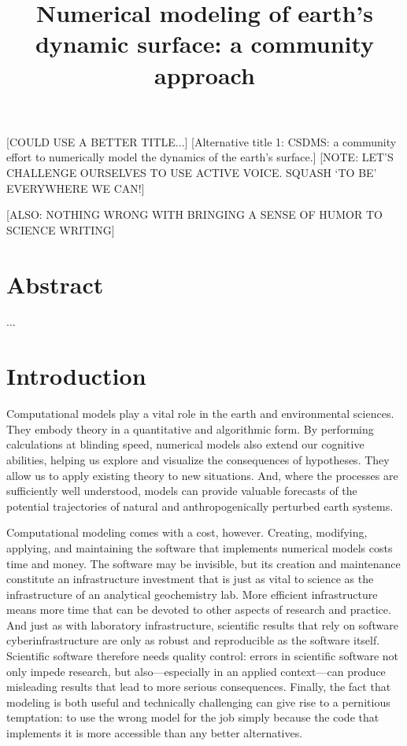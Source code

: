 \documentclass[12pt]{amsart}
\title{Numerical modeling of earth's dynamic surface: a community approach}
\author{}
\date{} %
\begin{document}
\maketitle

[COULD USE A BETTER TITLE...]
[Alternative title 1: CSDMS: a community effort to numerically model the dynamics of the earth’s surface.]
[NOTE: LET'S CHALLENGE OURSELVES TO USE ACTIVE VOICE. SQUASH `TO BE' EVERYWHERE WE CAN!]

[ALSO: NOTHING WRONG WITH BRINGING A SENSE OF HUMOR TO SCIENCE WRITING]

\section*{Abstract}

...


\section{Introduction}

Computational models play a vital role in the earth and environmental sciences. They embody theory in a quantitative and algorithmic form. By performing calculations at blinding speed, numerical models also extend our cognitive abilities, helping us explore and visualize the consequences of hypotheses. They allow us to apply existing theory to new situations. And, where the processes are sufficiently well understood, models can provide valuable forecasts of the potential trajectories of natural and anthropogenically perturbed earth systems.

Computational modeling comes with a cost, however. Creating, modifying, applying, and maintaining the software that implements numerical models costs time and money. The software may be invisible, but its creation and maintenance constitute an infrastructure investment that is just as vital to science as the infrastructure of an analytical geochemistry lab. More efficient infrastructure means more time that can be devoted to other aspects of research and practice. And just as with laboratory infrastructure, scientific results that rely on software cyberinfrastructure are only as robust and reproducible as the software itself. Scientific software therefore needs quality control: errors in scientific software not only impede research, but also---especially in an applied context---can produce misleading results that lead to more serious consequences. Finally, the fact that modeling is both useful and technically challenging can give rise to a pernitious temptation: to use the wrong model for the job simply because the code that implements it is more accessible than any better alternatives. 
\end{document}
